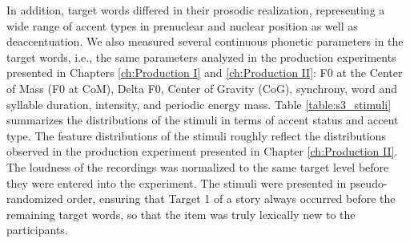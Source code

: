 In addition, target words differed in their prosodic realization, representing a wide range of accent types in prenuclear and nuclear position as well as deaccentuation. We also measured several continuous phonetic parameters in the target words, i.e., the same parameters analyzed in the production experiments presented in Chapters \ref{ch:Production I} and \ref{ch:Production II}: F0 at the Center of Mass (F0 at CoM), Delta F0, Center of Gravity (CoG), synchrony, word and syllable duration, intensity, and periodic energy mass. Table \ref{table:s3_stimuli} summarizes the distributions of the stimuli in terms of accent status and accent type. The feature distributions of the stimuli roughly reflect the distributions observed in the production experiment presented in Chapter \ref{ch:Production II}. The loudness of the recordings was normalized to the same target level before they were entered into the experiment. The stimuli were presented in pseudo-randomized order, ensuring that Target 1 of a story always occurred before the remaining target words, so that the item was truly lexically new to the participants.

